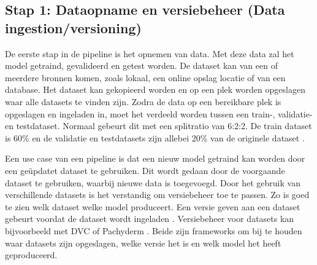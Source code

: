 \subsection{Stap 1: Dataopname en versiebeheer (Data ingestion/versioning)}\label{subsec:ch4-data-opname-en-versiebeheer}
De eerste stap in de pipeline is het opnemen van data. Met deze data zal het model getraind, gevalideerd en getest worden. De dataset kan van een of meerdere bronnen komen, zoals lokaal, een online opslag locatie of van een database. Het dataset kan gekopieerd worden en op een plek worden opgeslagen waar alle datasets te vinden zijn. Zodra de data op een bereikbare plek is opgeslagen en ingeladen in, moet het verdeeld worden tussen een train-, validatie- en testdataset. Normaal gebeurt dit met een splitratio van 6:2:2. De train dataset is 60\% en de validatie en testdatasets zijn allebei 20\% van de originele dataset \cite[p.~27-37]{building-machine-learning-pipelines-oreilly}.

Een use case van een pipeline is dat een nieuw model getraind kan worden door een geüpdatet dataset te gebruiken. Dit wordt gedaan door de voorgaande dataset te gebruiken, waarbij nieuwe data is toegevoegd. Door het gebruik van verschillende datasets is het verstandig om versiebeheer toe te passen. Zo is goed te zien welk dataset welke model produceert. Een versie geven aan een dataset gebeurt voordat de dataset wordt ingeladen \cite[p.~39-40]{building-machine-learning-pipelines-oreilly}. Versiebeheer voor datasets kan bijvoorbeeld met DVC \cite{dvc} of Pachyderm \cite{pachyderm}. Beide zijn frameworks om bij te houden waar datasets zijn opgeslagen, welke versie het is en welk model het heeft geproduceerd.



